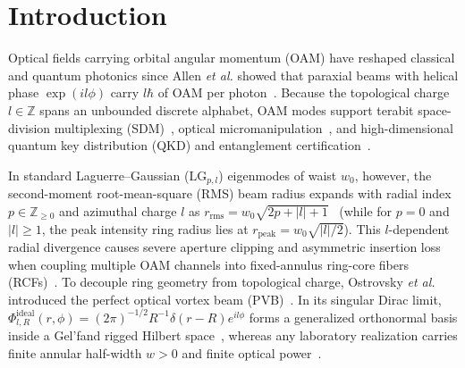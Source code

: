 \documentclass[aps,pra,reprint,amsmath,amssymb,floatfix,longbibliography]{revtex4-2}
\providecommand{\abs}[1]{\lvert#1\rvert}
\begin{document}
\section{Introduction}
\label{sec:intro}

Optical fields carrying orbital angular momentum (OAM) have reshaped classical and quantum photonics since Allen \emph{et al.} showed that paraxial beams with helical phase $\exp(il\phi)$ carry $l\hbar$ of OAM per photon~\cite{Allen1992}. Because the topological charge $l \in \mathbb{Z}$ spans an unbounded discrete alphabet, OAM modes support terabit space-division multiplexing (SDM)~\cite{Bozinovic2013,Willner2015,Wang2019}, optical micromanipulation~\cite{Padgett2011}, and high-dimensional quantum key distribution (QKD) and entanglement certification~\cite{Cerf2002,Mirhosseini2015,Bavaresco2018,Erhard2018}.

In standard Laguerre--Gaussian ($\mathrm{LG}_{p,l}$) eigenmodes of waist $w_0$, however, the second-moment root-mean-square (RMS) beam radius expands with radial index $p \in \mathbb{Z}_{\ge 0}$ and azimuthal charge $l$ as $r_{\mathrm{rms}} = w_0\sqrt{2p+\abs{l}+1}$~\cite{Allen1992,Siegman1986} (while for $p = 0$ and $\abs{l} \ge 1$, the peak intensity ring radius lies at $r_{\mathrm{peak}} = w_0\sqrt{\abs{l}/2}$). This $l$-dependent radial divergence causes severe aperture clipping and asymmetric insertion loss when coupling multiple OAM channels into fixed-annulus ring-core fibers (RCFs)~\cite{Ramachandran2009,Brunet2014,Gregg2015,Canas2021,RojasRojas2021,Villalba2023}. To decouple ring geometry from topological charge, Ostrovsky \emph{et al.} introduced the perfect optical vortex beam (PVB)~\cite{Ostrovsky2013,Vaity2015}. In its singular Dirac limit, $\Phi_{l,R}^{\mathrm{ideal}}(r,\phi) = (2\pi)^{-1/2} R^{-1}\delta(r-R)e^{il\phi}$ forms a generalized orthonormal basis inside a Gel'fand rigged Hilbert space~\cite{Gelfand1964}, whereas any laboratory realization carries finite annular half-width $w > 0$ and finite optical power~\cite{Vaity2015,Reddy2016}.
\end{document}
